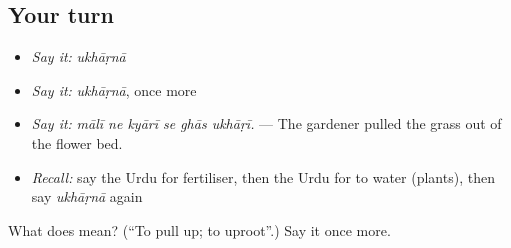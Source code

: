 \subsection*{Your turn}
\begin{itemize}
\raggedright
  \item \emph{Say it:} \emph{ukhāṛnā}
  \item \emph{Say it:} \emph{ukhāṛnā}, once more
  \item \emph{Say it:} \emph{mālī ne kyārī se ghās ukhāṛī.} — The gardener pulled the grass out of the flower bed.
  \item \emph{Recall:} say the Urdu for fertiliser, then the Urdu for to water (plants), then say \emph{ukhāṛnā} again
\end{itemize}

\begin{tcolorbox}[breakable,colback=teal!4,colframe=teal!35!black,title={Before you move on}]
What does  mean? (\textquotedblleft{}To pull up; to uproot\textquotedblright{}.) Say it once more.
\end{tcolorbox}
